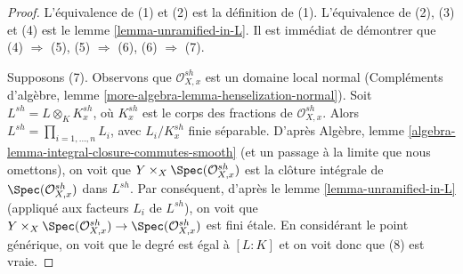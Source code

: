 \begin{proof}
L'équivalence de (1) et (2) est la définition de (1).
L'équivalence de (2), (3) et (4) est le lemme \ref{lemma-unramified-in-L}.
Il est immédiat de démontrer que (4) $\Rightarrow$ (5),
(5) $\Rightarrow$ (6), (6) $\Rightarrow$ (7).

\medskip\noindent
Supposons (7). Observons que $\mathcal{O}_{X, x}^{sh}$ est un domaine local normal
(Compléments d'algèbre, lemme \ref{more-algebra-lemma-henselization-normal}).
Soit $L^{sh} = L \otimes_K K_x^{sh}$, où $K_x^{sh}$ est le corps des fractions
de $\mathcal{O}_{X, x}^{sh}$. Alors $L^{sh} = \prod_{i = 1, \ldots, n} L_i$,
avec $L_i/K_x^{sh}$ finie séparable. D'après
Algèbre, lemme \ref{algebra-lemma-integral-closure-commutes-smooth}
(et un passage à la limite que nous omettons),
on voit que $Y \times_X \Spec(\mathcal{O}_{X, x}^{sh})$
est la clôture intégrale de $\Spec(\mathcal{O}_{X, x}^{sh})$ dans $L^{sh}$.
Par conséquent, d'après le lemme \ref{lemma-unramified-in-L} (appliqué aux facteurs
$L_i$ de $L^{sh}$), on voit que
$Y \times_X \Spec(\mathcal{O}_{X, x}^{sh}) \to \Spec(\mathcal{O}_{X, x}^{sh})$
est fini étale. En considérant le point générique, on voit que
le degré est égal à $[L : K]$ et on voit donc que (8) est vraie.


\end{proof}
